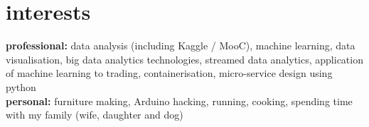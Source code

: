 \documentclass[]{friggeri-cv}
\begin{document}




\section{interests}

\textbf{professional:} data analysis (including Kaggle / MooC), machine learning, data visualisation, big data analytics technologies, streamed data analytics, application of machine learning to trading, containerisation, micro-service design using python \\

\textbf{personal:} furniture making, Arduino hacking, running, cooking, spending time with my family (wife, daughter and dog)


%
%
%
%
%
%

\end{document}
